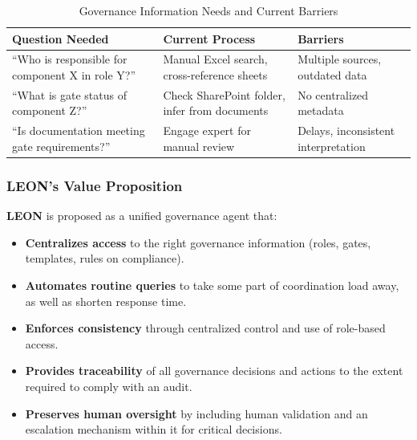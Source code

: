\begin{table}[!htbp]
\centering
\small
\setlength{\tabcolsep}{8pt}
\renewcommand{\arraystretch}{2.1}
\caption{Governance Information Needs and Current Barriers}
\begin{tabularx}{\textwidth}{|>{\raggedright\arraybackslash}X|>{\raggedright\arraybackslash}X|>{\raggedright\arraybackslash}X|}
\hline
\cellcolor[HTML]{E6F2FF}\textcolor[HTML]{003D99}{\textbf{Question Needed}} & \cellcolor[HTML]{E6F2FF}\textcolor[HTML]{003D99}{\textbf{Current Process}} & \cellcolor[HTML]{E6F2FF}\textcolor[HTML]{003D99}{\textbf{Barriers}} \\
\hline
``Who is responsible for component X in role Y?'' & Manual Excel search, cross-reference sheets & Multiple sources, outdated data \\
\hline
``What is gate status of component Z?'' & Check SharePoint folder, infer from documents & No centralized metadata \\
\hline
``Is documentation meeting gate requirements?'' & Engage expert for manual review & Delays, inconsistent interpretation \\
\hline
\end{tabularx}
\label{tab:information-needs}
\end{table}

\vspace{0.3cm}

\subsubsection*{\textcolor[HTML]{003D99}{LEON's Value Proposition}}

\textbf{\textcolor[HTML]{0066CC}{LEON}} is proposed as a unified governance agent that:

\begin{itemize}
  \item \textbf{Centralizes access} to the right governance information (roles, gates, templates, rules on compliance).
  \item \textbf{Automates routine queries} to take some part of coordination load away, as well as shorten response time.
  \item \textbf{Enforces consistency} through centralized control and use of role-based access.
  \item \textbf{Provides traceability} of all governance decisions and actions to the extent required to comply with an audit.
  \item \textbf{Preserves human oversight} by including human validation and an escalation mechanism within it for critical decisions.
\end{itemize}

